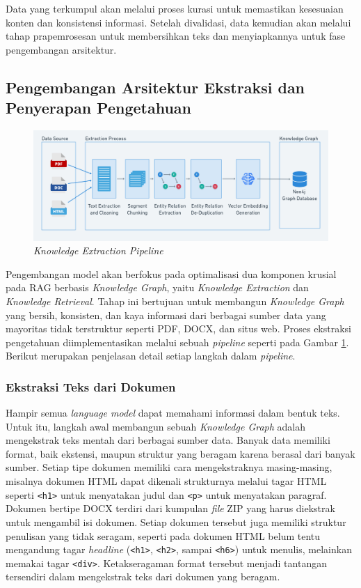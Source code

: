Data yang terkumpul akan melalui proses kurasi untuk memastikan kesesuaian konten dan konsistensi informasi.
Setelah divalidasi, data kemudian akan melalui tahap prapemrosesan untuk membersihkan teks dan menyiapkannya untuk fase pengembangan arsitektur.

\subsection{Pengembangan Arsitektur Ekstraksi dan Penyerapan Pengetahuan}

\begin{figure}[H]
	\centering
	\includegraphics[width=1\textwidth]{images/knowledge-extraction-flow.png}
	\caption{
		\textit{Knowledge Extraction Pipeline}
	}
	\label{fig:knowledge-extraction-pipeline}
\end{figure}

Pengembangan model akan berfokus pada optimalisasi dua komponen krusial pada RAG berbasis \textit{Knowledge Graph}, yaitu \textit{Knowledge Extraction} dan \textit{Knowledge Retrieval}.
Tahap ini bertujuan untuk membangun \textit{Knowledge Graph} yang bersih, konsisten, dan kaya informasi dari berbagai sumber data yang mayoritas tidak terstruktur seperti PDF, DOCX, dan situs web.
Proses ekstraksi pengetahuan diimplementasikan melalui sebuah \textit{pipeline} seperti pada Gambar \ref{fig:knowledge-extraction-pipeline}.
Berikut merupakan penjelasan detail setiap langkah dalam \textit{pipeline}.

\subsubsection{Ekstraksi Teks dari Dokumen}
Hampir semua \textit{language model} dapat memahami informasi dalam bentuk teks.
Untuk itu, langkah awal membangun sebuah \textit{Knowledge Graph} adalah mengekstrak teks mentah dari berbagai sumber data.
Banyak data memiliki format, baik ekstensi, maupun struktur yang beragam karena berasal dari banyak sumber.
Setiap tipe dokumen memiliki cara mengekstraknya masing-masing, misalnya dokumen HTML dapat dikenali strukturnya melalui tagar HTML seperti \texttt{<h1>} untuk menyatakan judul dan \texttt{<p>} untuk menyatakan paragraf.
Dokumen bertipe DOCX terdiri dari kumpulan \textit{file} ZIP yang harus diekstrak untuk mengambil isi dokumen.
Setiap dokumen tersebut juga memiliki struktur penulisan yang tidak seragam, seperti pada dokumen HTML belum tentu mengandung tagar \textit{headline} (\texttt{<h1>}, \texttt{<h2>}, sampai \texttt{<h6>}) untuk menulis, melainkan memakai tagar \texttt{<div>}.
Ketakseragaman format tersebut menjadi tantangan tersendiri dalam mengekstrak teks dari dokumen yang beragam.

